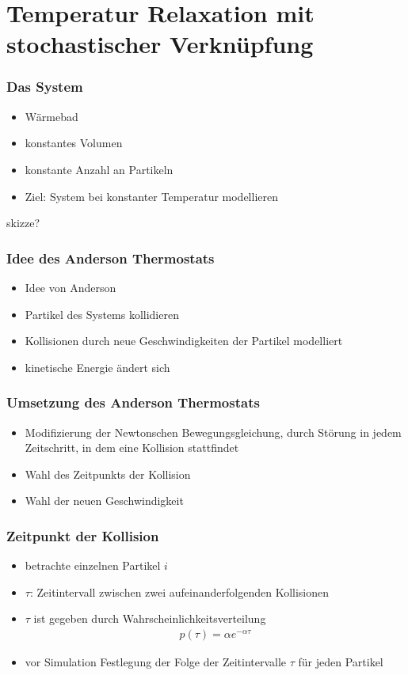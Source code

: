 \documentclass{beamer}
\begin{document}
\section{Temperatur Relaxation mit stochastischer Verknüpfung}
\begin{frame}
	\frametitle{Das System}
	\begin{itemize}
		\item Wärmebad
		\item konstantes Volumen
		\item konstante Anzahl an Partikeln
		\item Ziel: System bei konstanter Temperatur modellieren 
	\end{itemize}
	skizze?
\end{frame}

\begin{frame} 
	\frametitle{Idee des Anderson Thermostats} 
	\begin{itemize}
		\item Idee von Anderson
		\item Partikel des Systems kollidieren
		\item Kollisionen durch neue Geschwindigkeiten der Partikel modelliert
		\item kinetische Energie ändert sich
	\end{itemize}
\end{frame}


\begin{frame} 
	\frametitle{Umsetzung des Anderson Thermostats}
	\begin{itemize}
		\item Modifizierung der Newtonschen Bewegungsgleichung, durch Störung  in jedem Zeitschritt, in dem eine Kollision stattfindet
		\item Wahl des Zeitpunkts der Kollision
		\item Wahl der neuen Geschwindigkeit
	\end{itemize} 
\end{frame}

\begin{frame} 
	\frametitle{Zeitpunkt der Kollision}
	\begin{itemize}
		\item betrachte einzelnen Partikel $i$
		\item $\tau$: Zeitintervall zwischen zwei aufeinanderfolgenden Kollisionen
		\item $\tau$ ist gegeben durch Wahrscheinlichkeitsverteilung
		\begin{align*}
		p(\tau)= \alpha e^{- \alpha \tau}
		\end{align*}
		\item vor Simulation Festlegung der Folge der Zeitintervalle $\tau$ für jeden Partikel
	\end{itemize} 
\end{frame}
\end{document}
